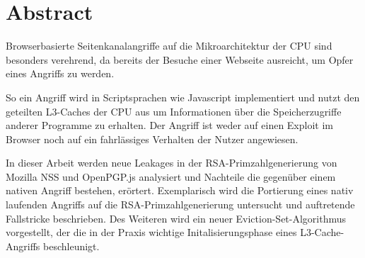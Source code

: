 \chapter*{Abstract}

Browserbasierte Seitenkanalangriffe auf die Mikroarchitektur der CPU sind besonders verehrend, da bereits der Besuche einer Webseite ausreicht, um Opfer eines Angriffs zu werden.

So ein Angriff wird in Scriptsprachen wie Javascript implementiert und nutzt den geteilten L3-Caches der CPU aus um Informationen über die Speicherzugriffe anderer Programme zu erhalten.
Der Angriff ist weder auf einen Exploit im Browser noch auf ein fahrlässiges Verhalten der Nutzer angewiesen.



In dieser Arbeit werden neue Leakages in der RSA-Primzahlgenerierung von Mozilla NSS und OpenPGP.js analysiert und Nachteile die gegenüber einem nativen Angriff bestehen, erörtert.
Exemplarisch wird die Portierung eines nativ laufenden Angriffs auf die RSA-Primzahlgenerierung %
untersucht und auftretende Fallstricke beschrieben.
Des Weiteren wird ein neuer Eviction-Set-Algorithmus vorgestellt, der die in der Praxis wichtige Initalisierungsphase eines L3-Cache-Angriffs beschleunigt. 